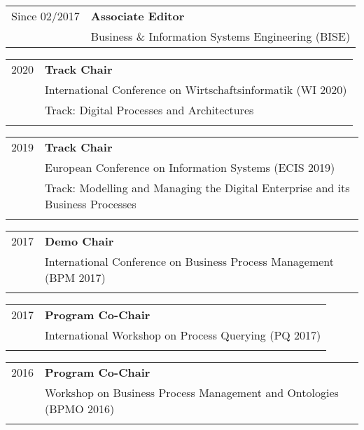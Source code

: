 \vspace{0.3cm}

\raggedright
\begin{tabular}{P{3cm}P{12cm}}
Since 02/2017 	& \textbf{Associate Editor}\\ 
							& Business \& Information Systems Engineering (BISE) \\
\end{tabular}

\vspace{0.5cm}
\vspace{0.3cm}

\raggedright
\begin{tabular}{P{3cm}P{12cm}}
2020 	& \textbf{Track Chair} \\
			& International Conference on Wirtschaftsinformatik (WI 2020) \\
			& Track: Digital Processes and Architectures \\
			& \\
\end{tabular}
\begin{tabular}{P{3cm}P{12cm}}
2019	& \textbf{Track Chair}\\ 
			& European Conference on Information Systems (ECIS 2019) \\
			& Track: Modelling and Managing the Digital Enterprise and its Business Processes \\
			& \\
			\end{tabular}
\begin{tabular}{P{3cm}P{12cm}}
2017	& \textbf{Demo Chair} \\
			& International Conference on Business Process Management (BPM 2017) \\
& \\			
			\end{tabular}
\begin{tabular}{P{3cm}P{12cm}}
2017	& \textbf{Program Co-Chair}  \\
			& International Workshop on Process Querying (PQ 2017) \\
& \\		
			\end{tabular}
\begin{tabular}{P{3cm}P{12cm}}
2016	& \textbf{Program Co-Chair} \\
			& Workshop on Business Process Management and Ontologies (BPMO 2016)\\
& \\		
			\end{tabular}
